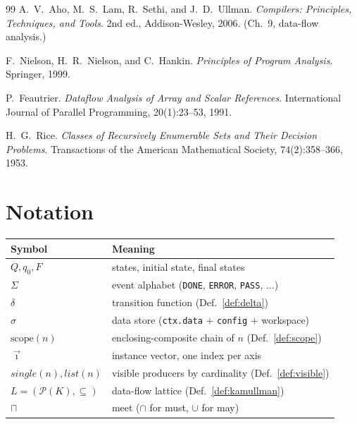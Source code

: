 \documentclass[11pt]{article}
\theoremstyle{plain}
\theoremstyle{definition}
\theoremstyle{remark}
\newcommand{\code}[1]{\texttt{#1}}
\newcommand{\transition}{\ensuremath{\delta}}
\newcommand{\powerset}{\mathcal{P}}
\newcommand{\meet}{\sqcap}
\begin{document}
\begin{thebibliography}{99}
 A.~V.~Aho, M.~S.~Lam, R.~Sethi, and J.~D.~Ullman.
\emph{Compilers: Principles, Techniques, and Tools}. 2nd ed., Addison-Wesley, 2006.
(Ch.~9, data-flow analysis.)

 F.~Nielson, H.~R.~Nielson, and C.~Hankin.
\emph{Principles of Program Analysis}. Springer, 1999.

 P.~Feautrier.
\emph{Dataflow Analysis of Array and Scalar References}.
International Journal of Parallel Programming, 20(1):23--53, 1991.

 H.~G.~Rice.
\emph{Classes of Recursively Enumerable Sets and Their Decision Problems}.
Transactions of the American Mathematical Society, 74(2):358--366, 1953.

\end{thebibliography}

\appendix
\section{Notation}
\begin{center}\small
\begin{tabular}{@{}ll@{}}
\toprule
Symbol & Meaning \\
\midrule
$Q, q_0, F$ & states, initial state, final states \\
$\Sigma$ & event alphabet (\code{DONE}, \code{ERROR}, \code{PASS}, $\dots$) \\
$\transition$ & transition function (Def.~\ref{def:delta}) \\
$\sigma$ & data store (\code{ctx.data} $+$ \code{config} $+$ workspace) \\
$\mathrm{scope}(n)$ & enclosing-composite chain of $n$ (Def.~\ref{def:scope}) \\
$\vec{\imath}$ & instance vector, one index per axis \\
$\mathit{single}(n), \mathit{list}(n)$ & visible producers by cardinality (Def.~\ref{def:visible}) \\
$L = (\powerset(K), \subseteq)$ & data-flow lattice (Def.~\ref{def:kamullman}) \\
$\meet$ & meet ($\cap$ for must, $\cup$ for may) \\
\bottomrule
\end{tabular}
\end{center}
\end{document}
